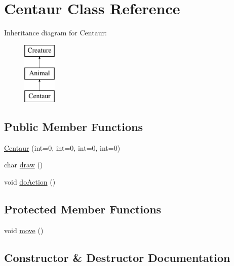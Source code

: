 \hypertarget{class_centaur}{}\section{Centaur Class Reference}
\label{class_centaur}
Inheritance diagram for Centaur\+:\begin{figure}[H]
\begin{center}
\leavevmode
\includegraphics[height=3.000000cm]{class_centaur}
\end{center}
\end{figure}
\subsection*{Public Member Functions}
\begin{DoxyCompactItemize}
\item 
\hyperlink{class_centaur_afc70d85a296f8bb7006525675ee4d92a}{Centaur} (int=0, int=0, int=0, int=0)
\item 
char \hyperlink{class_centaur_a377c0ba95b6599ce868049f551b37b6e}{draw} ()
\item 
void \hyperlink{class_centaur_a548d9ff34d62d1ba596a6dbdd3199216}{do\+Action} ()
\end{DoxyCompactItemize}
\subsection*{Protected Member Functions}
\begin{DoxyCompactItemize}
\item 
void \hyperlink{class_centaur_a3e69089861f1d984eb7528952c3c1d04}{move} ()
\end{DoxyCompactItemize}


\subsection{Constructor \& Destructor Documentation}
